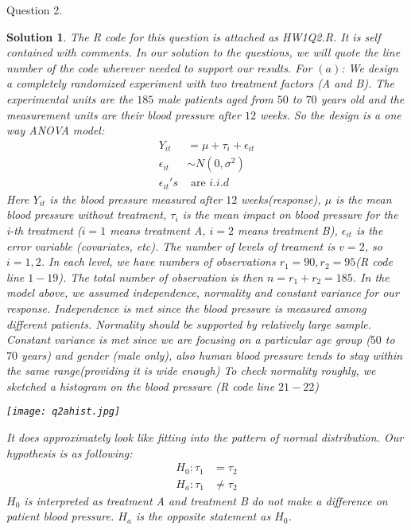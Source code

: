\documentclass[11pt]{article}
\newtheorem{sol}{Solution}
\begin{document}
Question 2.
\begin{sol}
	The R code for this question is attached as HW1Q2.R. It is self contained with comments. In our solution to the questions, we will quote the line number of the code wherever needed to support our results.\vskip 2mm
	For $(a)$:\vskip 2mm
	We design a completely randomized experiment with two treatment factors (A and B). The experimental units are the $185$ male patients aged from $50$ to $70$ years old and the measurement units are their blood pressure after $12$ weeks.\vskip 2mm
	So the design is a one way ANOVA model:
	\begin{align*}
		Y_{it} &= \mu + \tau_i + \epsilon_{it}\\
		\epsilon_{it} &\sim N(0, \sigma^2) \\
		\epsilon_{it}'s &\text{ are }i.i.d
	\end{align*}
	Here $Y_{it}$ is the blood pressure measured after $12$ weeks(response), $\mu$ is the mean blood pressure without treatment, $\tau_i$ is the mean impact on blood pressure for the i-th treatment ($i = 1$ means treatment A, $i = 2$ means treatment B), $\epsilon_{it}$ is the error variable (covariates, etc).\vskip 2mm
	The number of levels of treament is $v = 2$, so $i = 1, 2$. In each level, we have numbers of observations $r_1 = 90, r_2 = 95$(R code line $1-19$). The total number of observation is then $n = r_1 + r_2 = 185$. \vskip 2mm 
	In the model above, we assumed independence, normality and constant variance for our response. Independence is met since the blood pressure is measured among different patients. Normality should be supported by relatively large sample. Constant variance is met since we are focusing on a particular age group ($50$ to $70$ years) and gender (male only), also human blood pressure tends to stay within the same range(providing it is wide enough)\vskip 2mm
	To check normality roughly, we sketched a histogram on the blood pressure (R code line $21-22$)\vskip 2mm
	\begin{center}
	\texttt{[image: q2ahist.jpg]}
	\end{center}
	It does approximately look like fitting into the pattern of normal distribution.
	Our hypothesis is as following: 
	\begin{align*}
		H_0: \tau_1 &= \tau_2\\
		H_a: \tau_1 &\neq \tau_2
	\end{align*}
	$H_0$ is interpreted as treatment A and treatment B do not make a difference on patient blood pressure. $H_a$ is the opposite statement as $H_0$.\vskip 2mm

\end{sol}
\end{document}
